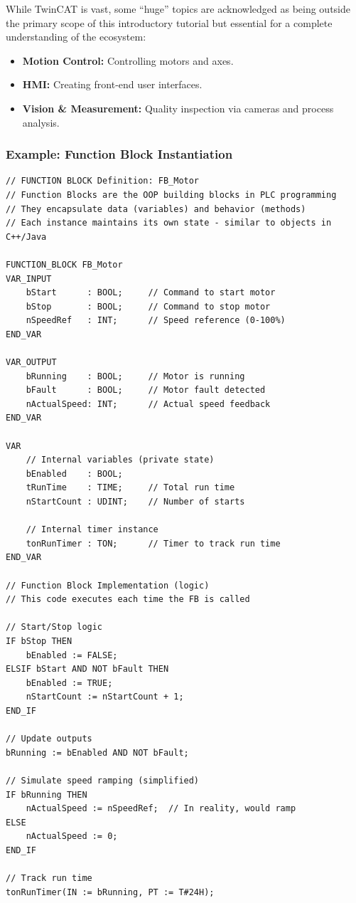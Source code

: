 \documentclass[11pt,a4paper]{article}
\begin{document}
While TwinCAT is vast, some ``huge'' topics are acknowledged as being outside the primary scope of this introductory tutorial but essential for a complete understanding of the ecosystem:

\begin{itemize}[leftmargin=*]
    \item \textbf{Motion Control:} Controlling motors and axes.
    \item \textbf{HMI:} Creating front-end user interfaces.
    \item \textbf{Vision \& Measurement:} Quality inspection via cameras and process analysis.
\end{itemize}

\subsubsection*{Example: Function Block Instantiation}

\begin{lstlisting}
// FUNCTION BLOCK Definition: FB_Motor
// Function Blocks are the OOP building blocks in PLC programming
// They encapsulate data (variables) and behavior (methods)
// Each instance maintains its own state - similar to objects in C++/Java

FUNCTION_BLOCK FB_Motor
VAR_INPUT
    bStart      : BOOL;     // Command to start motor
    bStop       : BOOL;     // Command to stop motor
    nSpeedRef   : INT;      // Speed reference (0-100%)
END_VAR

VAR_OUTPUT
    bRunning    : BOOL;     // Motor is running
    bFault      : BOOL;     // Motor fault detected
    nActualSpeed: INT;      // Actual speed feedback
END_VAR

VAR
    // Internal variables (private state)
    bEnabled    : BOOL;
    tRunTime    : TIME;     // Total run time
    nStartCount : UDINT;    // Number of starts
    
    // Internal timer instance
    tonRunTimer : TON;      // Timer to track run time
END_VAR

// Function Block Implementation (logic)
// This code executes each time the FB is called

// Start/Stop logic
IF bStop THEN
    bEnabled := FALSE;
ELSIF bStart AND NOT bFault THEN
    bEnabled := TRUE;
    nStartCount := nStartCount + 1;
END_IF

// Update outputs
bRunning := bEnabled AND NOT bFault;

// Simulate speed ramping (simplified)
IF bRunning THEN
    nActualSpeed := nSpeedRef;  // In reality, would ramp
ELSE
    nActualSpeed := 0;
END_IF

// Track run time
tonRunTimer(IN := bRunning, PT := T#24H);
\end{lstlisting}
\end{document}
